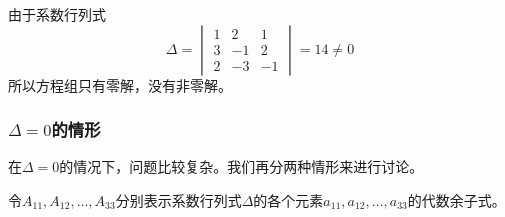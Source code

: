 \begin{solution}
    由于系数行列式
\[\Delta=\begin{vmatrix}
    1&2&1\\3&-1&2\\2&-3&-1
\end{vmatrix}=14\ne 0\]
所以方程组只有零解，没有非零解。
\end{solution}

\subsubsection{$\Delta=0$的情形}
在$\Delta=0$的情况下，问题比较复杂。我们再分两种情形来进行讨论。

令$A_{11},A_{12},\ldots,A_{33}$分别表示系数行列式$\Delta$的各个元素$a_{11},a_{12},\ldots,a_{33}$的代数余子式。

